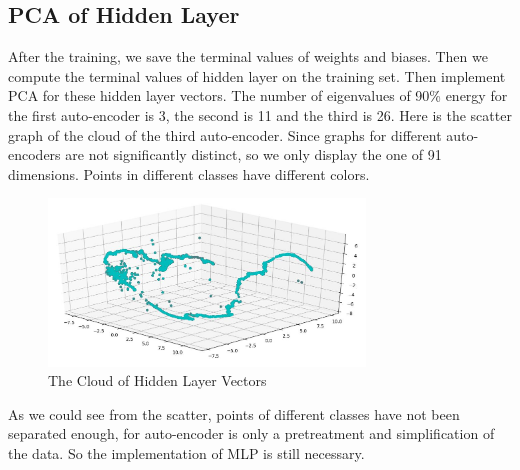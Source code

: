 \documentclass{article}
\begin{document}
  \subsection{PCA of Hidden Layer}
  After the training, we save the terminal values of weights and biases. Then we compute the terminal values of hidden layer on the training set. Then implement PCA for these hidden layer vectors. The number of eigenvalues of 90\% energy for the first auto-encoder is 3, the second is 11 and the third is 26. Here is the scatter graph of the cloud of the third auto-encoder. Since graphs for different auto-encoders are not significantly distinct, so we only display the one of 91 dimensions. Points in different classes have different colors.
  \begin{figure}[H]
  \centering
  \includegraphics[width=0.75\textwidth]{scatter.jpg}
  \caption{The Cloud of Hidden Layer Vectors}\label{}
  \end{figure}
  As we could see from the scatter, points of different classes have not been separated enough, for auto-encoder is only a pretreatment and simplification of the data. So the implementation of MLP is still necessary.
\end{document}
